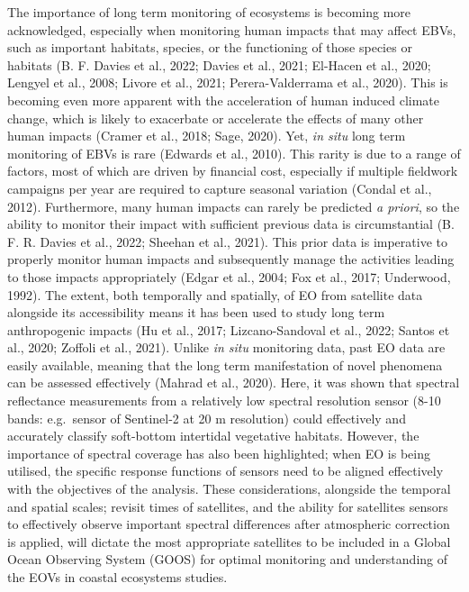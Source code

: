 \documentclass[
  letterpaper,
  11pt,
  english,
  singlespacing,
  headsepline]{MastersDoctoralThesis}
\begin{document}
\begin{spacing}{1.5}
The importance of long term monitoring of ecosystems is becoming more
acknowledged, especially when monitoring human impacts that may affect
EBVs, such as important habitats, species, or the functioning of those
species or habitats (B. F. Davies et al., 2022; Davies et al., 2021;
El-Hacen et al., 2020; Lengyel et al., 2008; Livore et al., 2021;
Perera-Valderrama et al., 2020). This is becoming even more apparent
with the acceleration of human induced climate change, which is likely
to exacerbate or accelerate the effects of many other human impacts
(Cramer et al., 2018; Sage, 2020). Yet, \emph{in situ} long term
monitoring of EBVs is rare (Edwards et al., 2010). This rarity is due to
a range of factors, most of which are driven by financial cost,
especially if multiple fieldwork campaigns per year are required to
capture seasonal variation (Condal et al., 2012). Furthermore, many
human impacts can rarely be predicted \emph{a priori}, so the ability to
monitor their impact with sufficient previous data is circumstantial (B.
F. R. Davies et al., 2022; Sheehan et al., 2021). This prior data is
imperative to properly monitor human impacts and subsequently manage the
activities leading to those impacts appropriately (Edgar et al., 2004;
Fox et al., 2017; Underwood, 1992). The extent, both temporally and
spatially, of EO from satellite data alongside its accessibility means
it has been used to study long term anthropogenic impacts (Hu et al.,
2017; Lizcano-Sandoval et al., 2022; Santos et al., 2020; Zoffoli et
al., 2021). Unlike \emph{in situ} monitoring data, past EO data are
easily available, meaning that the long term manifestation of novel
phenomena can be assessed effectively (Mahrad et al., 2020). Here, it
was shown that spectral reflectance measurements from a relatively low
spectral resolution sensor (8-10 bands: e.g.~sensor of Sentinel-2 at 20
m resolution) could effectively and accurately classify soft-bottom
intertidal vegetative habitats. However, the importance of spectral
coverage has also been highlighted; when EO is being utilised, the
specific response functions of sensors need to be aligned effectively
with the objectives of the analysis. These considerations, alongside the
temporal and spatial scales; revisit times of satellites, and the
ability for satellites sensors to effectively observe important spectral
differences after atmospheric correction is applied, will dictate the
most appropriate satellites to be included in a Global Ocean Observing
System (GOOS) for optimal monitoring and understanding of the EOVs in
coastal ecosystems studies.


\end{spacing}
\end{document}
